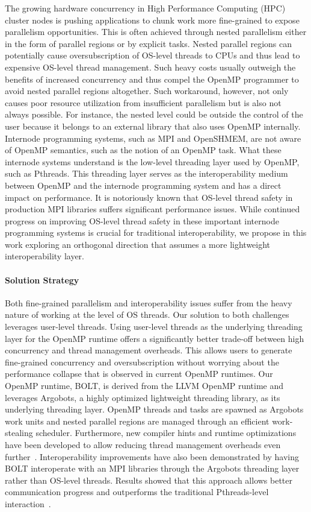 The growing hardware concurrency in High Performance Computing (HPC)
cluster nodes is pushing applications to chunk work more fine-grained
to expose parallelism opportunities.  This is often achieved through
nested parallelism either in the form of parallel regions or by
explicit tasks.  Nested parallel regions can potentially cause
oversubscription of OS-level threads to CPUs and thus lead to
expensive OS-level thread management.  Such heavy costs usually
outweigh the benefits of increased concurrency and thus compel the
OpenMP programmer to avoid nested parallel regions altogether.  Such
workaround, however, not only causes poor resource utilization from
insufficient parallelism but is also not always possible.  For
instance, the nested level could be outside the control of the user
because it belongs to an external library that also uses OpenMP
internally.  Internode programming systems, such as MPI and OpenSHMEM,
are not aware of OpenMP semantics, such as the notion of an OpenMP
task.  What these internode systems understand is the low-level
threading layer used by OpenMP, such as Pthreads.  This threading
layer serves as the interoperability medium between OpenMP and the
internode programming system and has a direct impact on performance.
It is notoriously known that OS-level thread safety in production MPI
libraries suffers significant performance issues. While continued
progress on improving OS-level thread safety in these important
internode programming systems is crucial for traditional
interoperability, we propose in this work exploring an orthogonal
direction that assumes a more lightweight interoperability layer.

\paragraph{Solution Strategy}

Both fine-grained parallelism and interoperability issues suffer from
the heavy nature of working at the level of OS threads.  Our solution
to both challenges leverages user-level threads.  Using user-level
threads as the underlying threading layer for the OpenMP runtime
offers a significantly better trade-off between high concurrency and
thread management overheads.  This allows users to generate
fine-grained concurrency and oversubscription without worrying about
the performance collapse that is observed in current OpenMP runtimes.
Our OpenMP runtime, BOLT, is derived from the LLVM OpenMP runtime and
leverages Argobots, a highly optimized lightweight threading library,
as its underlying threading layer.  OpenMP threads and tasks are
spawned as Argobots work units and nested parallel regions are managed
through an efficient work-stealing scheduler.  Furthermore, new
compiler hints and runtime optimizations have been developed to allow
reducing thread management overheads even further~\cite{iwasaki2018,
iwasaki2020}. Interoperability improvements have also been
demonstrated by having BOLT interoperate with an MPI libraries through
the Argobots threading layer rather than OS-level threads.  Results
showed that this approach allows better communication progress and
outperforms the traditional Pthreads-level interaction~\cite{seo2018}.

